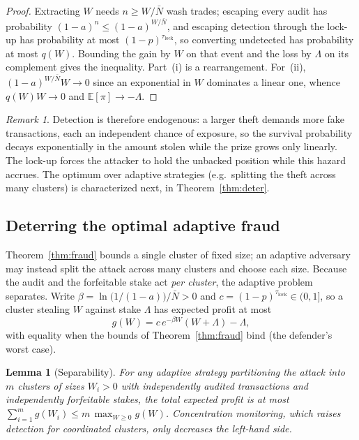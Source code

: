 \documentclass[11pt]{article}
\theoremstyle{plain}
\newtheorem{lemma}{Lemma}
\theoremstyle{definition}
\theoremstyle{remark}
\newtheorem{remark}{Remark}
\begin{document}
\begin{proof}
Extracting $W$ needs $n\ge W/\bar N$ wash trades; escaping every audit has probability $(1-a)^n\le(1-a)^{W/\bar N}$, and escaping detection through the lock-up has probability at most $(1-p)^{\tau_{\mathrm{lock}}}$, so converting undetected has probability at most $q(W)$. Bounding the gain by $W$ on that event and the loss by $\Lambda$ on its complement gives the inequality. Part~(i) is a rearrangement. For~(ii), $(1-a)^{W/\bar N}W\to0$ since an exponential in $W$ dominates a linear one, whence $q(W)W\to0$ and $\mathbb{E}[\pi]\to-\Lambda$.
\end{proof}

\begin{remark}
Detection is therefore endogenous: a larger theft demands more fake transactions, each an independent chance of exposure, so the survival probability decays exponentially in the amount stolen while the prize grows only linearly. The lock-up forces the attacker to hold the unbacked position while this hazard accrues. The optimum over adaptive strategies (e.g.\ splitting the theft across many clusters) is characterized next, in Theorem~\ref{thm:deter}.
\end{remark}

\subsection{Deterring the optimal adaptive fraud}

Theorem~\ref{thm:fraud} bounds a single cluster of fixed size; an adaptive adversary may instead split the attack across many clusters and choose each size. Because the audit and the forfeitable stake act \emph{per cluster}, the adaptive problem separates. Write $\beta=\ln\!\bigl(1/(1-a)\bigr)/\bar N>0$ and $c=(1-p)^{\tau_{\mathrm{lock}}}\in(0,1]$, so a cluster stealing $W$ against stake $\Lambda$ has expected profit at most
\[
g(W)=c\,e^{-\beta W}(W+\Lambda)-\Lambda ,
\]
with equality when the bounds of Theorem~\ref{thm:fraud} bind (the defender's worst case).

\begin{lemma}[Separability]\label{lem:sep}
For any adaptive strategy partitioning the attack into $m$ clusters of sizes $W_i>0$ with independently audited transactions and independently forfeitable stakes, the total expected profit is at most $\sum_{i=1}^{m} g(W_i)\le m\,\max_{W\ge0}g(W)$. Concentration monitoring, which raises detection for coordinated clusters, only decreases the left-hand side.
\end{lemma}
\end{document}
